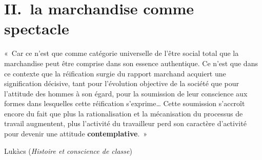 \documentclass[french,twoside]{book} %
\newcommand\term[1]{\textbf{#1}}
\newcommand{\bibl}[1]{{\smallskip\RaggedLeft\normalsize\normalfont #1\par\medskip}}}
\newenvironment{epigraph}{\begin{addmargin}[2\parindent]{0em}\sffamily\large\setstretch{0.95}}{\end{addmargin}\bigskip}
\newcommand\chapteropen{} %
\begin{document}
\chapteropen

\chapter[{II. la marchandise comme spectacle}]{II. la marchandise comme spectacle}
\renewcommand{\leftmark}{II. la marchandise comme spectacle}


\begin{epigraph}
\noindent « Car ce n’est que comme catégorie universelle de l’être social total que la marchandise peut être comprise dans son essence authentique. Ce n’est que dans ce contexte que la réification surgie du rapport marchand acquiert une signification décisive, tant pour l’évolution objective de la société que pour l’attitude des hommes à son égard, pour la soumission de leur conscience aux formes dans lesquelles cette réification s’exprime… Cette soumission s’accroît encore du fait que plus la rationalisation et la mécanisation du processus de travail augmentent, plus l’activité du travailleur perd son caractère d’activité pour devenir une attitude \term{contemplative}. »\par

\bibl{Lukàcs (\emph{Histoire et conscience de classe})}
\end{epigraph}
\end{document}
